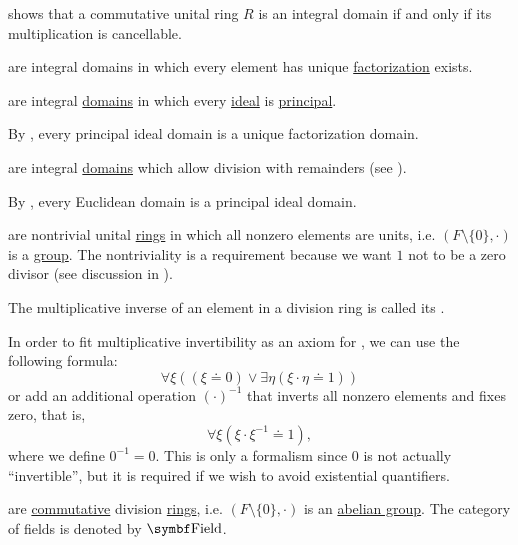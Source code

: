 \begin{definition}
\begin{DefEnum}[resume=def:semiring]
     shows that a commutative unital ring \( R \) is an integral domain if and only if its multiplication is cancellable.

      are integral domains in which every element has unique \hyperref[def:factorization_in_ring]{factorization} exists.

      are integral \hyperref[def:semiring/integral_domain]{domains} in which every \hyperref[def:semiring_ideal]{ideal} is \hyperref[def:principal_ideal]{principal}.

    By , every principal ideal domain is a unique factorization domain.

      are integral \hyperref[def:semiring/integral_domain]{domains} which allow division with remainders (see ).

    By , every Euclidean domain is a principal ideal domain.

      are nontrivial unital \hyperref[def:semiring/unital_ring]{rings} in which all nonzero elements are units, i.e. \( (F \setminus \{ 0 \}, \cdot) \) is a \hyperref[def:group]{group}. The nontriviality is a requirement because we want \( 1 \) not to be a zero divisor (see discussion in ).

    The multiplicative inverse of an element in a division ring is called its .

    In order to fit multiplicative invertibility as an axiom for , we can use the following formula:
    \begin{equation*}
      \forall \xi ((\xi \doteq 0) \lor \exists \eta (\xi \cdot \eta \doteq 1))
    \end{equation*}
    or add an additional operation \( (\cdot)^{-1} \) that inverts all nonzero elements and fixes zero, that is,
    \begin{equation*}
      \forall \xi (\xi \cdot \xi^{-1} \doteq 1),
    \end{equation*}
    where we define \( 0^{-1} = 0 \). This is only a formalism since \( 0 \) is not actually \enquote{invertible}, but it is required if we wish to avoid existential quantifiers.

      are \hyperref[def:magma/commutative]{commutative} division \hyperref[def:semiring/division_ring]{rings}, i.e. \( (F \setminus \{ 0 \}, \cdot) \) is an \hyperref[def:abelian_group]{abelian group}. The category of fields is denoted by \( \Cat{Field} \).
  \end{DefEnum}
\end{definition}

